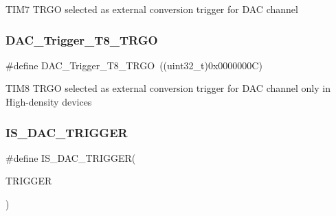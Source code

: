 T\+I\+M7 T\+R\+GO selected as external conversion trigger for D\+AC channel \mbox{\label{group___d_a_c__trigger__selection_ga756700c6621eadb807e21a16966580a0}} 
\subsubsection{\texorpdfstring{DAC\_Trigger\_T8\_TRGO}{DAC\_Trigger\_T8\_TRGO}}
{\footnotesize\ttfamily \#define D\+A\+C\+\_\+\+Trigger\+\_\+\+T8\+\_\+\+T\+R\+GO~((uint32\+\_\+t)0x0000000\+C)}

T\+I\+M8 T\+R\+GO selected as external conversion trigger for D\+AC channel only in High-\/density devices \mbox{\label{group___d_a_c__trigger__selection_ga4409b79639e6ae3b1f0ed61a33c810a3}} 
\subsubsection{\texorpdfstring{IS\_DAC\_TRIGGER}{IS\_DAC\_TRIGGER}}
{\footnotesize\ttfamily \#define I\+S\+\_\+\+D\+A\+C\+\_\+\+T\+R\+I\+G\+G\+ER(\begin{DoxyParamCaption}\item[{}]{T\+R\+I\+G\+G\+ER }\end{DoxyParamCaption})}

